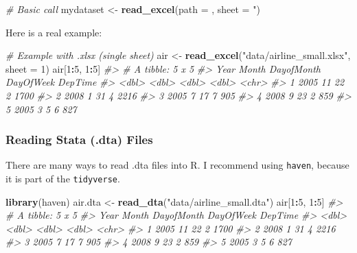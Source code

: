 \documentclass[
]{book}
\newenvironment{Shaded}{\begin{snugshade}}{\end{snugshade}}
\newcommand{\CommentTok}[1]{\textcolor[rgb]{0.56,0.35,0.01}{\textit{#1}}}
\newcommand{\DataTypeTok}[1]{\textcolor[rgb]{0.13,0.29,0.53}{#1}}
\newcommand{\DecValTok}[1]{\textcolor[rgb]{0.00,0.00,0.81}{#1}}
\newcommand{\KeywordTok}[1]{\textcolor[rgb]{0.13,0.29,0.53}{\textbf{#1}}}
\newcommand{\NormalTok}[1]{#1}
\newcommand{\OperatorTok}[1]{\textcolor[rgb]{0.81,0.36,0.00}{\textbf{#1}}}
\newcommand{\StringTok}[1]{\textcolor[rgb]{0.31,0.60,0.02}{#1}}
\begin{document}
\begin{Shaded}
\begin{Highlighting}[]
\CommentTok{# Basic call}
\NormalTok{mydataset <-}\StringTok{ }\KeywordTok{read_excel}\NormalTok{(}\DataTypeTok{path =}\NormalTok{ , }\DataTypeTok{sheet =} \StringTok{")}
\end{Highlighting}
\end{Shaded}

Here is a real example:

\begin{Shaded}
\begin{Highlighting}[]
\CommentTok{# Example with .xlsx (single sheet)}
\NormalTok{air <-}\StringTok{ }\KeywordTok{read_excel}\NormalTok{(}\StringTok{"data/airline_small.xlsx"}\NormalTok{, }\DataTypeTok{sheet =} \DecValTok{1}\NormalTok{) }
\NormalTok{air[}\DecValTok{1}\OperatorTok{:}\DecValTok{5}\NormalTok{, }\DecValTok{1}\OperatorTok{:}\DecValTok{5}\NormalTok{]}
\CommentTok{#> # A tibble: 5 x 5}
\CommentTok{#>    Year Month DayofMonth DayOfWeek DepTime}
\CommentTok{#>   <dbl> <dbl>      <dbl>     <dbl> <chr>  }
\CommentTok{#> 1  2005    11         22         2 1700   }
\CommentTok{#> 2  2008     1         31         4 2216   }
\CommentTok{#> 3  2005     7         17         7 905    }
\CommentTok{#> 4  2008     9         23         2 859    }
\CommentTok{#> 5  2005     3          5         6 827}
\end{Highlighting}
\end{Shaded}

\hypertarget{reading-stata-.dta-files}{%
\subsubsection*{Reading Stata (.dta) Files}\label{reading-stata-.dta-files}}

There are many ways to read .dta files into R. I recommend using \texttt{haven}, because it is part of the \texttt{tidyverse}.

\begin{Shaded}
\begin{Highlighting}[]
\KeywordTok{library}\NormalTok{(haven)}
\NormalTok{air.dta <-}\StringTok{ }\KeywordTok{read_dta}\NormalTok{(}\StringTok{"data/airline_small.dta"}\NormalTok{) }
\NormalTok{air[}\DecValTok{1}\OperatorTok{:}\DecValTok{5}\NormalTok{, }\DecValTok{1}\OperatorTok{:}\DecValTok{5}\NormalTok{]}
\CommentTok{#> # A tibble: 5 x 5}
\CommentTok{#>    Year Month DayofMonth DayOfWeek DepTime}
\CommentTok{#>   <dbl> <dbl>      <dbl>     <dbl> <chr>  }
\CommentTok{#> 1  2005    11         22         2 1700   }
\CommentTok{#> 2  2008     1         31         4 2216   }
\CommentTok{#> 3  2005     7         17         7 905    }
\CommentTok{#> 4  2008     9         23         2 859    }
\CommentTok{#> 5  2005     3          5         6 827}
\end{Highlighting}
\end{Shaded}
\end{document}
